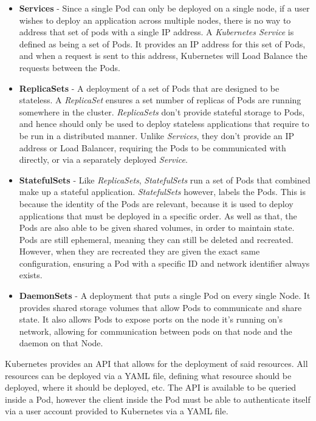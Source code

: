 \documentclass[a4paper,12pt]{report}
\begin{document}
\begin{itemize}
    \item \textbf{Services} - Since a single Pod can only be deployed on a single node, if a user wishes to deploy an application across multiple nodes, there is no way to address that set of pods with a single IP address. A \textit{Kubernetes Service} is defined as being a set of Pods. It provides an IP address for this set of Pods, and when a request is sent to this address, Kubernetes will Load Balance the requests between the Pods.
    \item \textbf{ReplicaSets} - A deployment of a set of Pods that are designed to be stateless. A \textit{ReplicaSet} ensures a set number of replicas of Pods are running somewhere in the cluster. \textit{ReplicaSets} don't provide stateful storage to Pods, and hence should only be used to deploy stateless applications that require to be run in a distributed manner. Unlike \textit{Services}, they don't provide an IP address or Load Balancer, requiring the Pods to be communicated with directly, or via a separately deployed \textit{Service}.
    \item \textbf{StatefulSets} - Like \textit{ReplicaSets}, \textit{StatefulSets} run a set of Pods that combined make up a stateful application.
    \textit{StatefulSets} however, labels the Pods. This is because the identity of the Pods are relevant, because it is used to deploy applications
    that must be deployed in a specific order. As well as that, the Pods are also able to be given shared volumes, in order to maintain state. 
    Pods are still ephemeral, meaning they can still be deleted and recreated. However, when they are recreated they are given the exact same configuration, ensuring a Pod with a specific ID and network identifier always exists.  
    \item \textbf{DaemonSets} - A deployment that puts a single Pod on every single Node. It provides shared storage volumes that allow Pods to communicate and share state. It also allows Pods to expose ports on the node it's running on's network, allowing for communication between pods on that node and the daemon on that Node.
\end{itemize}

Kubernetes provides an API that allows for the deployment of said resources. All resources can be deployed via a YAML file, defining what resource should be deployed, where it should be deployed, etc. The API is available to be queried inside a Pod, however the client inside the Pod must be able to authenticate itself via a user account provided to Kubernetes via a YAML file.
\end{document}
